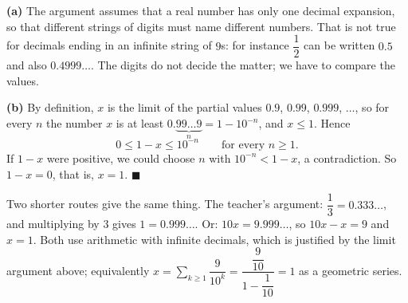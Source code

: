 \textbf{(a)} The argument assumes that a real number has only one decimal expansion, so that different strings of digits must name different numbers. That is not true for decimals ending in an infinite string of $9$s: for instance $\dfrac{1}{2}$ can be written $0.5$ and also $0.4999\ldots$. The digits do not decide the matter; we have to compare the values.

\textbf{(b)} By definition, $x$ is the limit of the partial values $0.9$, $0.99$, $0.999$, $\dots$, so for every $n$ the number $x$ is at least $0.\underbrace{99\ldots9}_{n}=1-10^{-n}$, and $x\le1$. Hence
\[
0\le 1-x\le10^{-n}\qquad\text{for every } n\ge1 .
\]
If $1-x$ were positive, we could choose $n$ with $10^{-n}<1-x$, a contradiction. So $1-x=0$, that is, $x=1$. $\blacksquare$

Two shorter routes give the same thing. The teacher's argument: $\dfrac{1}{3}=0.333\ldots$, and multiplying by $3$ gives $1=0.999\ldots$. Or: $10x=9.999\ldots$, so $10x-x=9$ and $x=1$. Both use arithmetic with infinite decimals, which is justified by the limit argument above; equivalently $x=\displaystyle\sum_{k\ge1}\dfrac{9}{10^k}=\dfrac{\dfrac{9}{10}}{1-\dfrac{1}{10}}=1$ as a geometric series.
